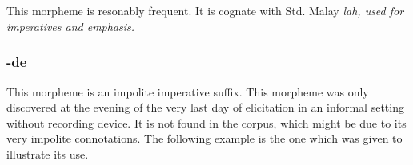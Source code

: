  \\

 \\


This morpheme is resonably frequent. It is cognate with  Std. Malay  \em lah, \em used for imperatives and emphasis.


\subsubsection{-de}\label{sec:morph:-de}
This morpheme is an impolite imperative suffix. This morpheme was only discovered at the evening of the very last day of elicitation in an informal setting without recording device. It is not found  in the corpus, which might be due to its very impolite connotations. The following example is the one which was given to illustrate its use.


 \\


